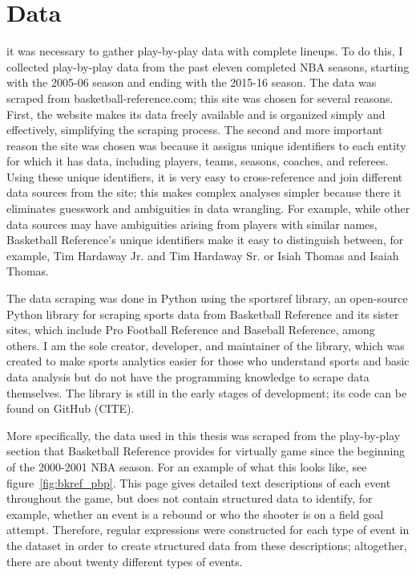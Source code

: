 
\chapter{Data} \label{ch:data}
\nocite{*}

 it was necessary to gather
play-by-play data with complete lineups. To do this, I collected play-by-play data
from the past eleven completed NBA seasons, starting with the 2005-06 season and
ending with the 2015-16 season. The data was scraped from basketball-reference.com;
this site was chosen for several reasons. First, the website makes its data freely
available and is organized simply and effectively, simplifying the scraping process.
The second and more important reason the site was chosen was because it assigns
unique identifiers to each entity for which it has data, including players, teams,
seasons, coaches, and referees. Using these unique identifiers, it is very easy to
cross-reference and join different data sources from the site; this makes complex
analyses simpler because there it eliminates guesswork and ambiguities in data
wrangling. For example, while other data sources may have ambiguities arising from
players with similar names, Basketball Reference's unique identifiers make it easy
to distinguish between, for example, Tim Hardaway Jr. and Tim Hardaway Sr. or Isiah
Thomas and Isaiah Thomas.

The data scraping was done in Python using the sportsref library, an open-source
Python library for scraping sports data from Basketball Reference and its sister
sites, which include Pro Football Reference and Baseball Reference, among others. I
am the sole creator, developer, and maintainer of the library, which was
created to make sports analytics easier for those who understand sports and basic
data analysis but do not have the programming knowledge to scrape data themselves.
The library is still in the early stages of development; its code can be found on
GitHub (CITE).

More specifically, the data used in this thesis was scraped from the play-by-play
section that Basketball Reference provides for virtually game since the beginning of
the 2000-2001 NBA season. For an example of what this looks like, see
figure~\ref{fig:bkref_pbp}. This page gives detailed text descriptions
of each event throughout the game, but does not contain structured data to identify,
for example, whether an event is a rebound or who the shooter is on a field goal
attempt. Therefore, regular expressions were constructed for each type of event in
the dataset in order to create structured data from these descriptions; altogether,
there are about twenty different types of events.

